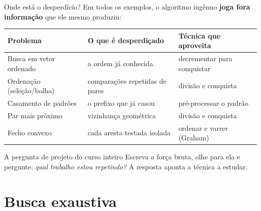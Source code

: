 \documentclass[aspectratio=169]{beamer}
\begin{document}
\begin{frame}{Onde está o desperdício?}
  Em todos os exemplos, o algoritmo ingênuo \textbf{joga fora informação} que ele
  mesmo produziu:

  \smallskip
  \begin{center}
  \footnotesize
  \begin{tabular}{@{}lll@{}}
    \toprule
    \textbf{Problema} & \textbf{O que é desperdiçado} & \textbf{Técnica que aproveita} \\
    \midrule
    Busca em vetor ordenado & a ordem já conhecida & decrementar para conquistar \\
    Ordenação (seleção/bolha) & comparações repetidas de pares & divisão e conquista \\
    Casamento de padrões & o prefixo que já casou & pré-processar o padrão \\
    Par mais próximo & vizinhança geométrica & divisão e conquista \\
    Fecho convexo & cada aresta testada isolada & ordenar e varrer (Graham) \\
    \bottomrule
  \end{tabular}
  \end{center}

  \begin{block}{A pergunta de projeto do curso inteiro}
    Escreva a força bruta, olhe para ela e pergunte: \emph{qual trabalho estou
    repetindo?} A resposta aponta a técnica a estudar.
  \end{block}
\end{frame}

\section{Busca exaustiva}
\end{document}
